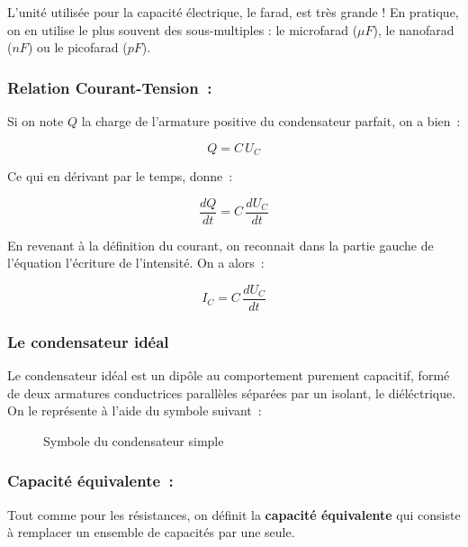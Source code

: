 L'unité utilisée pour la capacité électrique, le farad, est très grande ! En pratique, on en utilise le plus souvent des sous-multiples : le microfarad ($\mu F$), le nanofarad ($nF$) ou le picofarad ($pF$). 


\subsubsection{ Relation Courant-Tension~: }

Si on note $Q$ la charge de l'armature positive du condensateur parfait, on a bien~:

$$Q = C\,U_C$$

Ce qui en dérivant par le temps, donne~:

$$\dfrac{dQ}{dt} = C\,\dfrac{dU_C}{dt}$$

En revenant à la définition du courant, on reconnait dans la partie gauche de l'équation l'écriture de l'intensité. On a alors~:

\begin{equation}
	I_C = C\,\dfrac{dU_C}{dt}
\end{equation}

\subsubsection{Le condensateur idéal}

Le condensateur idéal est un dipôle au comportement purement capacitif, formé de deux armatures conductrices parallèles séparées par un isolant, le diéléctrique. On le représente à l'aide du symbole suivant~:

\begin{figure}[!h]
\centering

\caption{Symbole du condensateur simple}
\end{figure}

\subsubsection{ Capacité équivalente~: }

Tout comme pour les résistances, on définit la \textbf{capacité équivalente} qui consiste à remplacer un ensemble de capacités par une seule.\\ 

